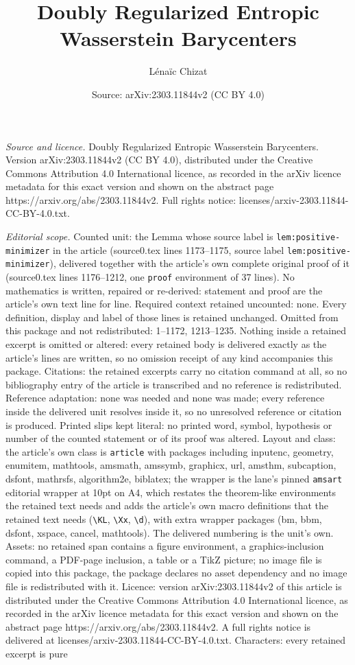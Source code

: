 \documentclass[10pt,a4paper]{amsart}
\title[Doubly Regularized Entropic Wasserstein Barycenters]{Doubly Regularized Entropic Wasserstein Barycenters}
\author{L\'ena\"ic Chizat}
\date{Source: arXiv:2303.11844v2 (CC BY 4.0)}
\begin{document}
\maketitle

\noindent\emph{Source and licence.} Doubly Regularized Entropic Wasserstein Barycenters. Version arXiv:2303.11844v2 (CC BY 4.0), distributed under the Creative Commons Attribution 4.0 International licence, as recorded in the arXiv licence metadata for this exact version and shown on the abstract page https://arxiv.org/abs/2303.11844v2. Full rights notice: licenses/arxiv-2303.11844-CC-BY-4.0.txt.\par\smallskip

\noindent\textit{Editorial scope.} Counted unit: the Lemma whose source label is \texttt{lem:positive-minimizer} in the article (source0.tex lines 1173--1175, source label \texttt{lem:positive-minimizer}), delivered together with the article's own complete original proof of it (source0.tex lines 1176--1212, one \texttt{proof} environment of 37 lines). No mathematics is written, repaired or re-derived: statement and proof are the article's own text line for line. Required context retained uncounted: none. Every definition, display and label of those lines is retained unchanged. Omitted from this package and not redistributed: 1--1172, 1213--1235. Nothing inside a retained excerpt is omitted or altered: every retained body is delivered exactly as the article's lines are written, so no omission receipt of any kind accompanies this package. Citations: the retained excerpts carry no citation command at all, so no bibliography entry of the article is transcribed and no reference is redistributed. Reference adaptation: none was needed and none was made; every reference inside the delivered unit resolves inside it, so no unresolved reference or citation is produced. Printed slips kept literal: no printed word, symbol, hypothesis or number of the counted statement or of its proof was altered. Layout and class: the article's own class is \texttt{article} with packages including inputenc, geometry, enumitem, mathtools, amsmath, amssymb, graphicx, url, amsthm, subcaption, dsfont, mathrsfs, algorithm2e, biblatex; the wrapper is the lane's pinned \texttt{amsart} editorial wrapper at 10pt on A4, which restates the theorem-like environments the retained text needs and adds the article's own macro definitions that the retained text needs (\texttt{\textbackslash KL}, \texttt{\textbackslash Xx}, \texttt{\textbackslash d}), with extra wrapper packages (bm, bbm, dsfont, xspace, cancel, mathtools). The delivered numbering is the unit's own. Assets: no retained span contains a figure environment, a graphics-inclusion command, a PDF-page inclusion, a table or a TikZ picture; no image file is copied into this package, the package declares no asset dependency and no image file is redistributed with it. Licence: version arXiv:2303.11844v2 of this article is distributed under the Creative Commons Attribution 4.0 International licence, as recorded in the arXiv licence metadata for this exact version and shown on the abstract page https://arxiv.org/abs/2303.11844v2. A full rights notice is delivered at licenses/arxiv-2303.11844-CC-BY-4.0.txt. Characters: every retained excerpt is pure 
\end{document}
